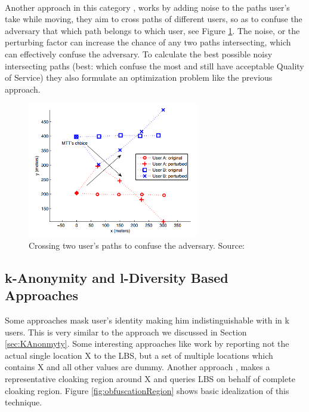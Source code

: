 \documentclass[12pt]{report}
\theoremstyle{named}
\begin{document}
\paragraph{}
Another approach in this category \cite{hoh2005protecting}, works by adding noise to the paths user's take while moving, they aim to cross paths of different users, so as to confuse the adversary that which path belongs to which user, see Figure \ref{fig:pathConfusion}. The noise, or the perturbing factor can increase the chance of any two paths intersecting, which can effectively confuse the adversary. To calculate the best possible noisy intersecting paths (best: which confuse the most and still have acceptable Quality of Service) they also formulate an optimization problem like the previous approach. 
\begin{figure}[ht]
\centering
        \includegraphics[width=75mm,scale=0.5]{Images/PathConfusion.PNG}
    \caption{Crossing two user's paths to confuse the adversary. Source:\cite{hoh2005protecting}}
    \label{fig:pathConfusion}
\end{figure}

\subsection{k-Anonymity and l-Diversity Based Approaches}
Some approaches mask user's identity making him indistinguishable with in k users. This is very similar to the approach we discussed in Section \ref{sec:KAnonmyty}. Some interesting approaches like \cite{kido2005protection} work by reporting not the actual single location X to the LBS, but a set of multiple locations which contains X and all other values are dummy. Another approach \cite{duckham2005formal}, makes a representative cloaking region around X and queries LBS on behalf of complete cloaking region. Figure \ref{fig:obfuscationRegion} shows basic idealization of this technique.
\end{document}

